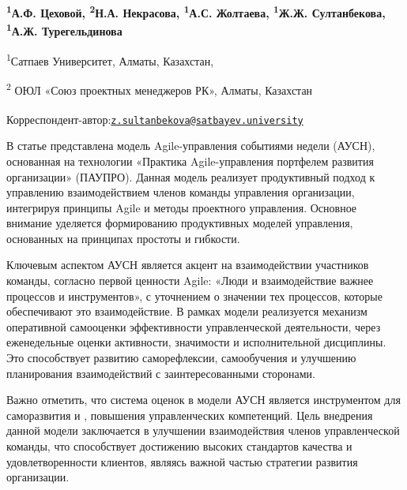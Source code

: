 
\begin{articleheader}

{\bfseries \textsuperscript{1}А.Ф. Цеховой, \textsuperscript{2}Н.А.
Некрасова, \textsuperscript{1}А.С. Жолтаева, \textsuperscript{1}Ж.Ж.
Султанбекова\textsuperscript{\envelope }, \textsuperscript{1}А.Ж. Турегельдинова}
\end{articleheader}
\begin{affiliation}

\textsuperscript{1}Сатпаев Университет, Алматы, Казахстан,

\textsuperscript{2} ОЮЛ «Союз проектных менеджеров РК», Алматы,
Казахстан

\raggedright{\bfseries \textsuperscript{\envelope }}Корреспондент-автор:\href{mailto:z.sultanbekova@satbayev.university}{\nolinkurl{z.sultanbekova@satbayev.university}}
\end{affiliation}

В статье представлена модель Agile-управления событиями недели (АУСН),
основанная на технологии «Практика Agile-управления портфелем развития
организации» (ПАУПРО). Данная модель реализует продуктивный подход к
управлению взаимодействием членов команды управления организации,
интегрируя принципы Agile и методы проектного управления. Основное
внимание уделяется формированию продуктивных моделей управления,
основанных на принципах простоты и гибкости.

Ключевым аспектом АУСН является акцент на взаимодействии участников
команды, согласно первой ценности Agile: «Люди и взаимодействие важнее
процессов и инструментов», с уточнением о значении тех процессов,
которые обеспечивают это взаимодействие. В рамках модели реализуется
механизм оперативной самооценки эффективности управленческой
деятельности, через еженедельные оценки активности, значимости и
исполнительной дисциплины. Это способствует развитию саморефлексии,
самообучения и улучшению планирования взаимодействий с заинтересованными
сторонами.

Важно отметить, что система оценок в модели АУСН является инструментом
для саморазвития и , повышения управленческих компетенций. Цель
внедрения данной модели заключается в улучшении взаимодействия членов
управленческой команды, что способствует достижению высоких стандартов
качества и удовлетворенности клиентов, являясь важной частью стратегии
развития организации.

